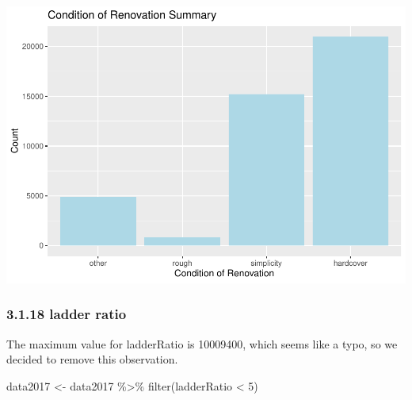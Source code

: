 \documentclass[
]{article}
\newenvironment{Shaded}{\begin{snugshade}}{\end{snugshade}}
\newcommand{\DecValTok}[1]{\textcolor[rgb]{0.00,0.00,0.81}{#1}}
\newcommand{\FunctionTok}[1]{\textcolor[rgb]{0.00,0.00,0.00}{#1}}
\newcommand{\NormalTok}[1]{#1}
\newcommand{\OtherTok}[1]{\textcolor[rgb]{0.56,0.35,0.01}{#1}}
\newcommand{\SpecialCharTok}[1]{\textcolor[rgb]{0.00,0.00,0.00}{#1}}
\begin{document}
\includegraphics{Project_files/figure-latex/unnamed-chunk-31-1.pdf}

\hypertarget{ladder-ratio}{%
\subsubsection{3.1.18 ladder ratio}\label{ladder-ratio}}

The maximum value for ladderRatio is 10009400, which seems like a typo,
so we decided to remove this observation.

\begin{Shaded}
\begin{Highlighting}[]
\NormalTok{data2017 }\OtherTok{\textless{}{-}}\NormalTok{ data2017 }\SpecialCharTok{\%\textgreater{}\%} 
  \FunctionTok{filter}\NormalTok{(ladderRatio }\SpecialCharTok{\textless{}} \DecValTok{5}\NormalTok{)}
\end{Highlighting}
\end{Shaded}

\begin{Shaded}
\end{Shaded}
\end{document}
